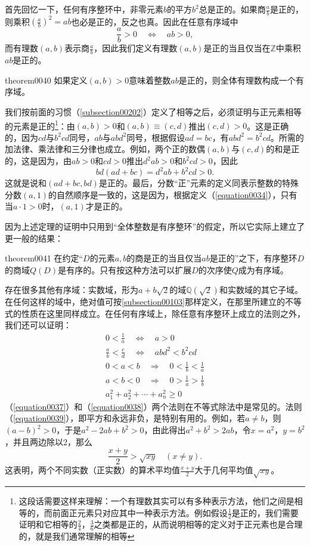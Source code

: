 首先回忆一下，任何有序整环中，非零元素$b$的平方$b^2$总是正的。如果商$\frac{a}{b}$是正的，则乘积$(\frac{a}{b})^2=ab$也必是正的，反之也真。因此在任意有序域中
\begin{equation}\label{equation0034}
\frac{a}{b} > 0 \quad \Leftrightarrow \quad ab>0,
\end{equation}
而有理数$(a, b)$表示商$\frac{a}{b}$，因此我们定义有理数$(a,b)$是正的当且仅当在$\mathbb{Z}$中乘积$ab$是正的。
\begin{theorem}{}{theorem0040}
如果定义$(a, b)>0$意味着整数$ab$是正的，则全体有理数构成一个有序域。
\end{theorem}
我们按前面的习惯（\ref{subsection00202}）定义了相等之后，必须证明与正元素相等的元素是正的\footnote{这段话需要这样来理解：一个有理数其实可以有多种表示方法，他们之间是相等的，而前面正元素只对应其中一种表示方法。例如假设$\frac{1}{2}$是正的，我们需要证明和它相等的$\frac{2}{4}$，$\frac{3}{6}$之类都是正的，从而说明相等的定义对于正元素也是合理的，就是我们通常理解的相等}：由$(a, b)>0$和$(a, b) \equiv (c, d)$推出$(c, d)>0$。这是正确的，因为$cd$与$b^2cd$同号，$ab$与$abd^2$同号，根据假设$ad=bc$，有$abd^2=b^2cd$。所需的加法律、乘法律和三分律也成立。例如，两个正的数偶$(a, b)$与$(c, d)$的和是正的，这是因为，由$ab>0$和$cd>0$推出$d^2ab>0$和$b^2cd>0$，因此
\[
bd(ad+bc) = d^2ab + b^2cd > 0.
\]
这就是说和$(ad+bc, bd)$是正的。最后，分数“正”元素的定义同表示整数的特殊分数$(a, 1)$的自然顺序是一致的，这是因为，根据定义（\ref{equation0034}），只有当$a \cdot 1 > 0$时，$(a, 1)$才是正的。

因为上述定理的证明中只用到“全体整数是有序整环”的假定，所以它实际上建立了更一般的结果：
\begin{theorem}{}{theorem0041}
在约定“$D$的元素$a, b$的商是正的当且仅当$ab$是正的”之下，有序整环$D$的商域$Q(D)$是有序的。只有按这种方法可以扩展$D$的次序使$Q$成为有序域。
\end{theorem}

存在很多其他有序域：实数域，形为$a+b\sqrt{2}$的域$\mathbb{Q}(\sqrt{2})$和实数域的其它子域。在任何这样的域中，绝对值可按\ref{subsection00103}那样定义，在那里所建立的不等式的性质在这里同样成立。在任何有序域上，除任意有序整环上成立的法则之外，我们还可以证明：
\begin{gather}
0 < \frac{1}{a} \quad \Leftrightarrow \quad a > 0 \label{equation0035}\\
\frac{a}{b} < \frac{c}{d} \quad \Leftrightarrow \quad abd^2 < b^2cd \label{equation0036}\\
0 < a < b \quad \Rightarrow \quad 0 < \frac{1}{b} < \frac{1}{a} \label{equation0037}\\
a < b < 0 \quad\Rightarrow\quad 0 > \frac{1}{a} > \frac{1}{b} \label{equation0038}\\
a_1^2+a_2^2+\cdots+a_n^2 \ge 0 \label{equation0039}
\end{gather}
（\ref{equation0037}）和（\ref{equation0038}）两个法则在不等式除法中是常见的。法则（\ref{equation0039}），即平方和永远非负，是特别有用的。例如，若$a \neq b$，则$(a-b)^2>0$，于是$a^2-2ab+b^2>0$，由此得出$a^2+b^2 > 2ab$，令$x=a^2$，$y=b^2$，并且两边除以2，那么
\[
\frac{x+y}{2} > \sqrt{xy}\quad(x \neq y).
\]
这表明，两个不同实数（正实数）的算术平均值$\frac{x+y}{2}$大于几何平均值$\sqrt{xy}$。

